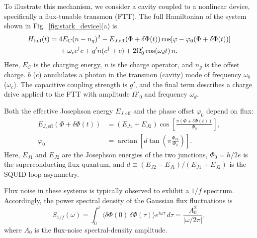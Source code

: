 To illustrate this mechanism, we consider a cavity coupled to a nonlinear device, specifically a flux-tunable transmon (FTT). The full Hamiltonian of the system shown in Fig.~\ref{fig:stark_device}(a) is
\begin{align}
\label{fullhamiltonian}
H_{\text{full}}(t)=\;&4E_C (n-n_g)^2
-E_{J,\mathrm{eff}}\!\left(\Phi+\delta\Phi(t)\right)
\cos\!\left[{\varphi}-{\varphi_0\!\left(\Phi+\delta\Phi(t)\right)}\right] \notag\\
&+\omega_c c^{\dagger}c
+g' n (c^{\dagger}+c)
+2\Omega'_0\cos(\omega_d t)\,n .
\end{align}
Here, \(E_C\) is the charging energy, \(n\) is the charge operator, and \(n_g\) is the offset charge. \(b\) (\(c\)) annihilates a photon in the transmon (cavity) mode of frequency \(\omega_b\) (\(\omega_c\)). The capacitive coupling strength is \(g'\), and the final term describes a charge drive applied to the FTT with amplitude \(\Omega'_0\) and frequency \(\omega_d\).

Both the effective Josephson energy \(E_{J,\mathrm{eff}}\) and the phase offset \(\varphi_0\) depend on flux:
\begin{equation}
\begin{aligned}
    E_{J,\mathrm{eff}}\!\left(\Phi+\delta\Phi(t)\right)
    &= (E_{J1}+E_{J2}) \cos\!\left[\frac{\pi\left(\Phi+\delta\Phi(t)\right)}{\Phi_0}\right],\\
    \varphi_0
    &= \arctan\!\left[
    d\tan\!\left(\pi\frac{\Phi_{\mathrm{ex}}}{\Phi_0}\right)
    \right].
\end{aligned}
\end{equation}
Here, \(E_{J1}\) and \(E_{J2}\) are the Josephson energies of the two junctions, \(\Phi_0=h/2e\) is the superconducting flux quantum, and \(d \equiv (E_{J2}-E_{J1})/({E_{J1}+E_{J2}})\) is the SQUID-loop asymmetry.

Flux noise in these systems is typically observed to exhibit a \(1/f\) spectrum. Accordingly, the power spectral density of the Gaussian flux fluctuations is
\begin{equation}
    S_{1/f}(\omega) = \int_0^{t} \langle \delta \Phi(0)\, \delta\Phi(\tau) \rangle e^{i\omega \tau}\, d\tau
    = \frac{A^2_0}{|\omega / 2 \pi|},
\end{equation}
where \(A_0\) is the flux-noise spectral-density amplitude.

